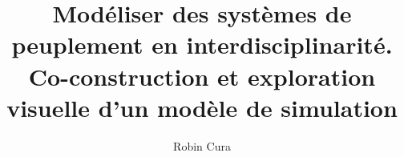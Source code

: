 
\usepackage{titling}
\title{Modéliser des systèmes de peuplement en interdisciplinarité. Co-construction et exploration visuelle d’un modèle de simulation}
\author{Robin Cura}
\date{\vspace{-5ex}}
\makeatletter
\newcommand*{\toccontents}{\@starttoc{toc}}
\makeatother


\newcommand{\simfeodal}{\textsc{SimFeodal}}
\newcommand{\simedb}{\textsc{SimEDB}}


\emergencystretch=1cm


\usepackage[toc,title]{appendix}
\renewcommand{\appendixtocname}{Annexes}
\renewcommand{\appendixpagename}{Annexes} 

\usepackage{pdfpages}